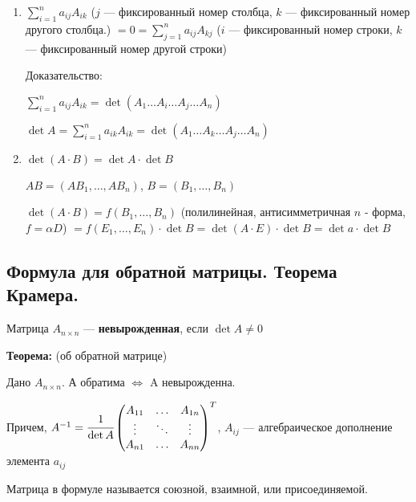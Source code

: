 \begin{enumerate}
    \item \(\sum\limits_{i = 1}^n a_{ij} A_{ik} \) (\(j\) --- фиксированный номер столбца, \(k\) --- фиксированный номер другого столбца.) \( = 0 = \sum\limits_{j = 1}^n a_{ij} A_{kj}\) (\(i\) --- фиксированный номер строки, \(k\) --- фиксированный номер другой строки)


          Доказательство:

          \( \sum\limits_{i=1}^n a_{ij}A_{ik} = \det (A_1\ldots A_i \ldots A_j\ldots A_n)\)

          \(\det A = \sum\limits_{i=1}^n a_{ik}A_{ik} = \det (A_1\ldots A_k \ldots A_j\ldots A_n)\)


    \item \(\det(A \cdot B) = \det A \cdot \det B\)

          \(AB = (AB_1, \ldots, AB_n)\), \(B = (B_1, \ldots, B_n)\)

          \(\det(A \cdot B) = f(B_1, \ldots, B_n)\) (полилинейная, антисимметричная \(n\) - форма, \(f = \alpha D\))
          \(= f(E_1, \ldots, E_n) \cdot \det B = \det(A \cdot E) \cdot \det B = \det a \cdot \det B\)

\end{enumerate}

\subsection{Формула для обратной матрицы. Теорема Крамера.}

Матрица \(A_{n \times n}\) --- \textbf{невырожденная}, если \(\det A \neq 0\)

\textbf{Теорема:} (об обратной матрице)

Дано \(A_{n\times n}\). А обратима $\Leftrightarrow$ A невырожденна.

Причем, \(A^{-1}=\cfrac{1}{\det A}
\begin{pmatrix}
    A_{11} & \ldots & A_{1n} \\
    \vdots & \ddots & \vdots \\
    A_{n1} & \ldots & A_{nn}
\end{pmatrix}^T\), \(A_{ij}\) --- алгебраическое дополнение элемента \(a_{ij}\)


Матрица в формуле называется союзной, взаимной, или присоединяемой.

